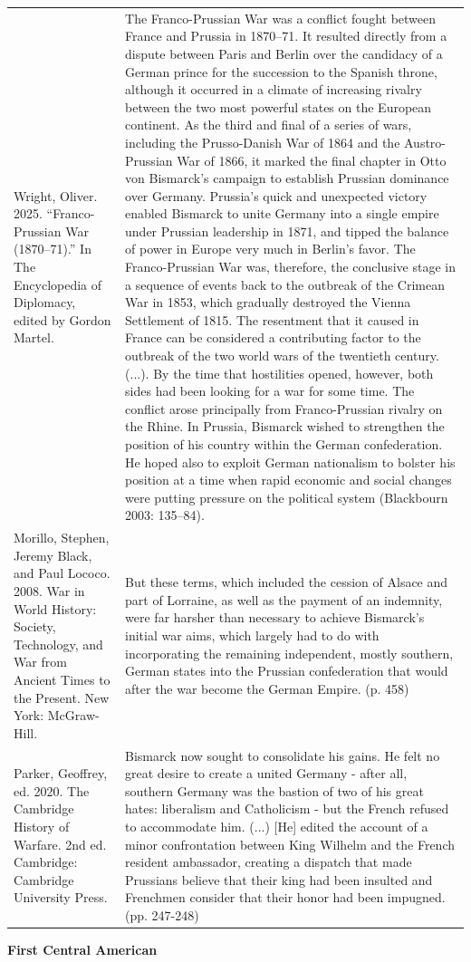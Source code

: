 {\begin{longtable}{p{}p{}}
\\
Wright, Oliver. 2025. “Franco-Prussian War (1870–71).” In The Encyclopedia of Diplomacy, edited by Gordon Martel. & The Franco-Prussian War was a conflict fought between France and Prussia in 1870–71. It resulted directly from a dispute between Paris and Berlin over the candidacy of a German prince for the succession to the Spanish throne, although it occurred in a climate of increasing rivalry between the two most powerful states on the European continent. As the third and final of a series of wars, including the Prusso-Danish War of 1864 and the Austro-Prussian War of 1866, it marked the final chapter in Otto von Bismarck's campaign to establish Prussian dominance over Germany. Prussia's quick and unexpected victory enabled Bismarck to unite Germany into a single empire under Prussian leadership in 1871, and tipped the balance of power in Europe very much in Berlin's favor. The Franco-Prussian War was, therefore, the conclusive stage in a sequence of events back to the outbreak of the Crimean War in 1853, which gradually destroyed the Vienna Settlement of 1815. The resentment that it caused in France can be considered a contributing factor to the outbreak of the two world wars of the twentieth century. (...). 
By the time that hostilities opened, however, both sides had been looking for a war for some time. The conflict arose principally from Franco-Prussian rivalry on the Rhine. In Prussia, Bismarck wished to strengthen the position of his country within the German confederation. He hoped also to exploit German nationalism to bolster his position at a time when rapid economic and social changes were putting pressure on the political system (Blackbourn 2003: 135–84).
\\
Morillo, Stephen, Jeremy Black, and Paul Lococo. 2008. War in World History: Society, Technology, and War from Ancient Times to the Present. New York: McGraw-Hill. & But these terms, which included the cession of Alsace and part of Lorraine, as well as the payment of an indemnity, were far harsher than necessary to achieve Bismarck's initial war aims, which largely had to do with incorporating the remaining independent, mostly southern, German states into the Prussian confederation that would after the war become the German Empire. (p. 458)
\\
Parker, Geoffrey, ed. 2020. The Cambridge History of Warfare. 2nd ed. Cambridge: Cambridge University Press. & Bismarck now sought to consolidate his gains. He felt no great desire to create a united Germany - after all, southern Germany was the bastion of two of his great hates: liberalism and Catholicism - but the French refused to accommodate him. (...) [He] edited the account of a minor confrontation between King Wilhelm and the French resident ambassador, creating a dispatch that made Prussians believe that their king had been insulted and Frenchmen consider that their honor had been impugned. (pp. 247-248)
\\
\end{longtable}}
\clearpage
         \textbf{First Central American} 

